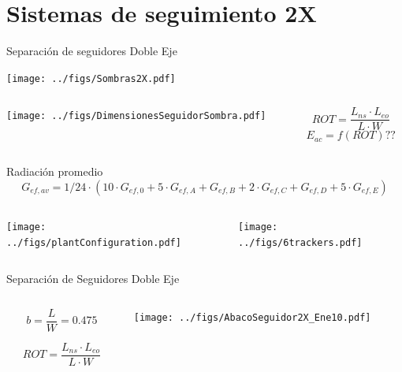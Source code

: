 \documentclass[aspectratio=169, usenames,svgnames,dvipsnames]{beamer}
\begin{document}
\section{Sistemas de seguimiento 2X}
\label{sec:org5e33c23}


\begin{frame}[label={sec:org8872e91}]{Separación de seguidores Doble Eje}
\begin{center}
\texttt{[image: ../figs/Sombras2X.pdf]}
\end{center}

\begin{columns}
\begin{column}{0.6\columnwidth}
\begin{center}
\texttt{[image: ../figs/DimensionesSeguidorSombra.pdf]}
\end{center}
\end{column}

\begin{column}{0.4\columnwidth}
$$ROT=\frac{L_{ns}\cdot L_{eo}}{L \cdot W}$$
$$E_{ac}=f(ROT)??$$
\end{column}
\end{columns}
\end{frame}

\begin{frame}[label={sec:orge4ad23b}]{Radiación promedio}
$$G_{ef, av} = 1/24 \cdot \left( 10 \cdot G_{ef,0} + 5 \cdot G_{ef,A} + G_{ef,B} + 2 \cdot G_{ef,C} + G_{ef,D} + 5 \cdot G_{ef,E} \right)$$

\begin{columns}
\begin{column}{0.4\columnwidth}
\begin{center}
\texttt{[image: ../figs/plantConfiguration.pdf]}
\end{center}
\end{column}

\begin{column}{0.6\columnwidth}
\begin{center}
\texttt{[image: ../figs/6trackers.pdf]}
\end{center}
\end{column}
\end{columns}
\end{frame}


\begin{frame}[label={sec:org70f61c9}]{Separación de Seguidores Doble Eje}
\begin{columns}
\begin{column}{0.3\columnwidth}
$$b=\frac{L}{W}=0.475$$

$$ROT=\frac{L_{ns}\cdot L_{eo}}{L \cdot W}$$
\end{column}

\begin{column}{0.7\columnwidth}
\begin{center}
\texttt{[image: ../figs/AbacoSeguidor2X\_Ene10.pdf]}
\end{center}
\end{column}
\end{columns}
\end{frame}
\end{document}
